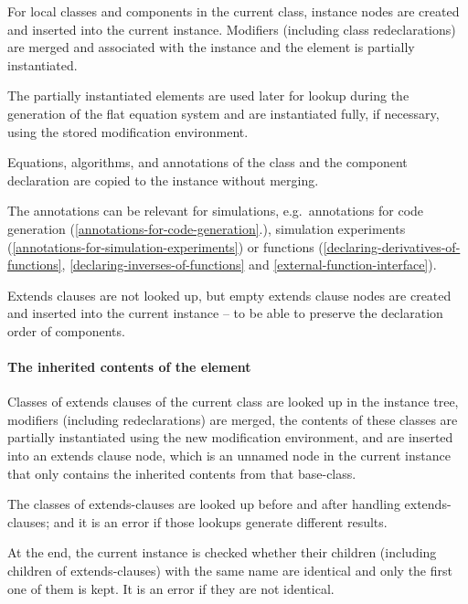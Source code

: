 For local classes and components in the current class, instance nodes
are created and inserted into the current instance. Modifiers (including
class redeclarations) are merged and associated with the instance and
the element is partially instantiated.

\begin{nonnormative}
The partially instantiated elements are used later for lookup during the generation of the flat equation system and are instantiated fully, if necessary, using the
stored modification environment.
\end{nonnormative}

Equations, algorithms, and annotations of the class and the component
declaration are copied to the instance without merging.

\begin{nonnormative}
The annotations can be relevant for simulations, e.g.\ annotations for code generation (\cref{annotations-for-code-generation}.), simulation experiments
(\cref{annotations-for-simulation-experiments}) or functions (\cref{declaring-derivatives-of-functions}, \cref{declaring-inverses-of-functions} and \cref{external-function-interface}).
\end{nonnormative}

Extends clauses are not looked up, but empty extends clause nodes are
created and inserted into the current instance -- to be able to preserve
the declaration order of components.

\paragraph*{The inherited contents of the element}\label{the-inherited-contents-of-the-element}

Classes of extends clauses of the current class are looked up in the
instance tree, modifiers (including redeclarations) are merged, the
contents of these classes are partially instantiated using the new
modification environment, and are inserted into an extends clause node,
which is an unnamed node in the current instance that only contains the
inherited contents from that base-class.

The classes of extends-clauses are looked up before and after handling
extends-clauses; and it is an error if those lookups generate different
results.

At the end, the current instance is checked whether their children
(including children of extends-clauses) with the same name are identical
and only the first one of them is kept.  It is an error if they are not identical.

